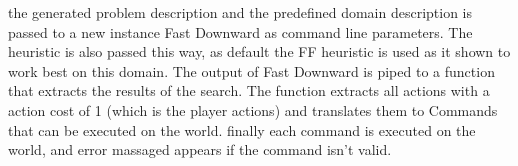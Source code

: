 	

	
	
	the generated problem description and the predefined domain description is passed to a new instance Fast Downward as command line parameters. The heuristic is also passed this way, as default the FF heuristic is used as it shown to work best on this domain. The output of Fast Downward is piped to a function that extracts the results of the search. The function extracts all actions with a action cost of 1 (which is the player actions) and translates them to Commands that can be executed on the world. finally each command is executed on the world, and error massaged appears if the command isn't valid. 